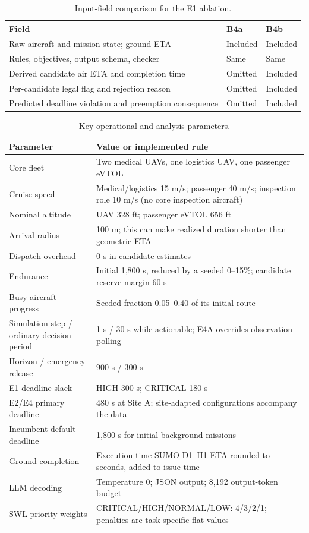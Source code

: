 \documentclass[11pt,a4paper]{article}
\begin{document}
\begin{table}[H]\centering\small
\caption{Input-field comparison for the E1 ablation.}\label{tab:S10}
\begin{tabularx}{\textwidth}{@{}Yll@{}}\toprule
Field & B4a & B4b \\\midrule
Raw aircraft and mission state; ground ETA & Included & Included \\
Rules, objectives, output schema, checker & Same & Same \\
Derived candidate air ETA and completion time & Omitted & Included \\
Per-candidate legal flag and rejection reason & Omitted & Included \\
Predicted deadline violation and preemption consequence & Omitted & Included \\\bottomrule
\end{tabularx}\end{table}

\begin{table}[H]\centering\small
\caption{Key operational and analysis parameters.}\label{tab:S11}
\begin{tabularx}{\textwidth}{@{}lY@{}}\toprule
Parameter & Value or implemented rule \\\midrule
Core fleet & Two medical UAVs, one logistics UAV, one passenger eVTOL \\
Cruise speed & Medical/logistics 15 m/s; passenger 40 m/s; inspection role 10 m/s (no core inspection aircraft) \\
Nominal altitude & UAV 328 ft; passenger eVTOL 656 ft \\
Arrival radius & 100 m; this can make realized duration shorter than geometric ETA \\
Dispatch overhead & 0 s in candidate estimates \\
Endurance & Initial 1,800 s, reduced by a seeded 0--15\%; candidate reserve margin 60 s \\
Busy-aircraft progress & Seeded fraction 0.05--0.40 of its initial route \\
Simulation step / ordinary decision period & 1 s / 30 s while actionable; E4A overrides observation polling \\
Horizon / emergency release & 900 s / 300 s \\
E1 deadline slack & HIGH 300 s; CRITICAL 180 s \\
E2/E4 primary deadline & 480 s at Site A; site-adapted configurations accompany the data \\
Incumbent default deadline & 1,800 s for initial background missions \\
Ground completion & Execution-time SUMO D1--H1 ETA rounded to seconds, added to issue time \\
LLM decoding & Temperature 0; JSON output; 8,192 output-token budget \\
SWL priority weights & CRITICAL/HIGH/NORMAL/LOW: 4/3/2/1; penalties are task-specific flat values \\\bottomrule
\end{tabularx}\end{table}
\end{document}
